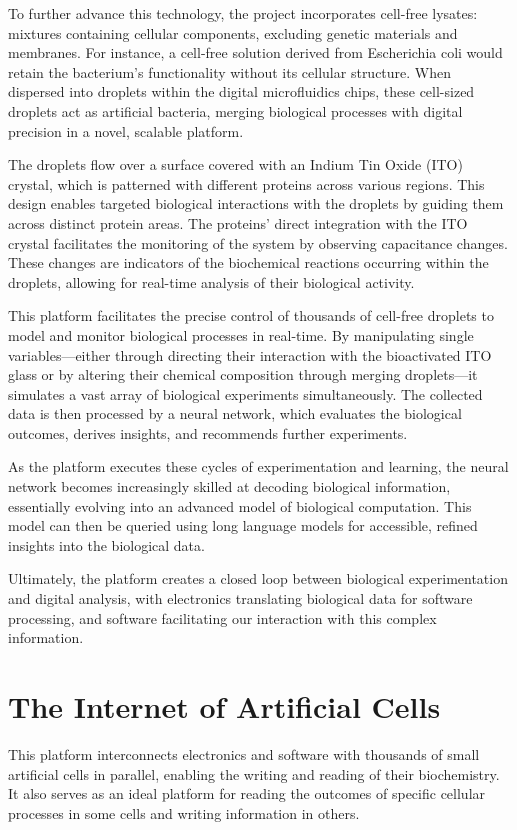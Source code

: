 \documentclass[conference]{IEEEtran}
\begin{document}
To further advance this technology, the project incorporates cell-free lysates: mixtures containing cellular components, excluding genetic materials and membranes. For instance, a cell-free solution derived from Escherichia coli would retain the bacterium's functionality without its cellular structure. When dispersed into droplets within the digital microfluidics chips, these cell-sized droplets act as artificial bacteria, merging biological processes with digital precision in a novel, scalable platform.

The droplets flow over a surface covered with an Indium Tin Oxide (ITO) crystal, which is patterned with different proteins across various regions. This design enables targeted biological interactions with the droplets by guiding them across distinct protein areas. The proteins' direct integration with the ITO crystal facilitates the monitoring of the system by observing capacitance changes. These changes are indicators of the biochemical reactions occurring within the droplets, allowing for real-time analysis of their biological activity.

This platform facilitates the precise control of thousands of cell-free droplets to model and monitor biological processes in real-time. By manipulating single variables—either through directing their interaction with the bioactivated ITO glass or by altering their chemical composition through merging droplets—it simulates a vast array of biological experiments simultaneously. The collected data is then processed by a neural network, which evaluates the biological outcomes, derives insights, and recommends further experiments.

As the platform executes these cycles of experimentation and learning, the neural network becomes increasingly skilled at decoding biological information, essentially evolving into an advanced model of biological computation. This model can then be queried using long language models for accessible, refined insights into the biological data.

Ultimately, the platform creates a closed loop between biological experimentation and digital analysis, with electronics translating biological data for software processing, and software facilitating our interaction with this complex information.

\section{The Internet of Artificial Cells}
This platform interconnects electronics and software with thousands of small artificial cells in parallel, enabling the writing and reading of their biochemistry. It also serves as an ideal platform for reading the outcomes of specific cellular processes in some cells and writing information in others.
\end{document}
